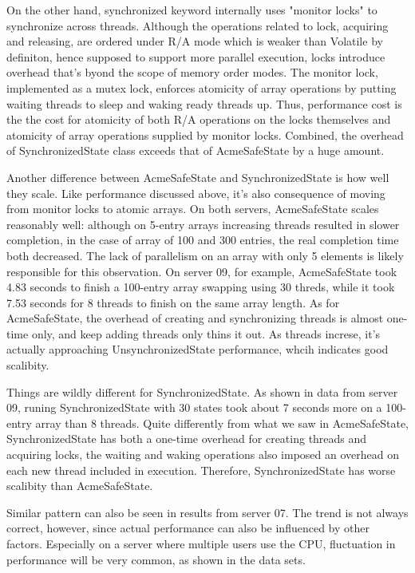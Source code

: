 \documentclass[letterpaper,twocolumn,10pt]{article}
\begin{document}
On the other hand, synchronized keyword internally uses "monitor locks" to synchronize across threads.
Although the operations related to lock, acquiring and releasing, are ordered under R/A mode which is weaker than Volatile by definiton,
hence supposed to support more parallel execution,
locks introduce overhead that's byond the scope of memory order modes.
The monitor lock, implemented as a mutex lock, enforces atomicity of array operations by putting waiting threads to sleep and waking ready threads up.
Thus, performance cost is the the cost for atomicity of both R/A operations on the locks themselves and atomicity of array operations supplied by monitor locks.
Combined, the overhead of SynchronizedState class exceeds that of AcmeSafeState by a huge amount.

Another difference between AcmeSafeState and SynchronizedState is how well they scale. 
Like performance discussed above, it's also consequence of moving from monitor locks to atomic arrays.
On both servers, AcmeSafeState scales reasonably well: although on 5-entry arrays increasing threads resulted in slower completion,
in the case of array of 100 and 300 entries, the real completion time both decreased.
The lack of parallelism on an array with only 5 elements is likely responsible for this observation.
On server 09, for example, AcmeSafeState took 4.83 seconds to finish a 100-entry array swapping using 30 threds,
while it took 7.53 seconds for 8 threads to finish on the same array length.
As for AcmeSafeState, the overhead of creating and synchronizing threads is almost one-time only, and keep adding threads only thins it out.
As threads increse, it's actually approaching UnsynchronizedState performance, whcih indicates good scalibity.

Things are wildly different for SynchronizedState.
As shown in data from server 09, runing SynchronizedState with 30 states took about 7 seconds more on a 100-entry array than 8 threads.
Quite differently from what we saw in AcmeSafeState, SynchronizedState has both a one-time overhead for creating threads and acquiring locks,
the waiting and waking operations also imposed an overhead on each new thread included in execution.
Therefore, SynchronizedState has worse scalibity than AcmeSafeState.

Similar pattern can also be seen in results from server 07. 
The trend is not always correct, however, since actual performance can also be influenced by other factors.
Especially on a server where multiple users use the CPU, fluctuation in performance will be very common, as shown in the data sets.


% 

\end{document}
